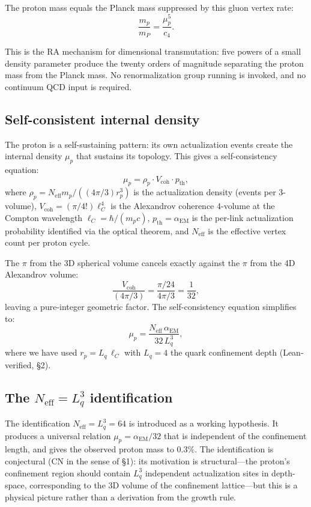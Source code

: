 \documentclass[11pt]{article}
\begin{document}
The proton mass equals the Planck mass suppressed by this gluon vertex rate:
\begin{equation}
\frac{m_p}{m_P} = \frac{\mu_p^5}{c_4}.
\end{equation}

This is the RA mechanism for dimensional transmutation: five powers of a small density parameter produce the twenty orders of magnitude separating the proton mass from the Planck mass. No renormalization group running is invoked, and no continuum QCD input is required.

\subsection{Self-consistent internal density}

The proton is a self-sustaining pattern: its own actualization events create the internal density $\mu_p$ that sustains its topology. This gives a self-consistency equation:
\begin{equation}
\mu_p = \rho_p\cdot V_{\mathrm{coh}}\cdot p_{\mathrm{th}},
\end{equation}
where $\rho_p=N_{\mathrm{eff}}m_p/((4\pi/3)r_p^3)$ is the actualization density (events per 3-volume), $V_{\mathrm{coh}}=(\pi/4!)\ell_C^4$ is the Alexandrov coherence 4-volume at the Compton wavelength $\ell_C=\hbar/(m_p c)$, $p_{\mathrm{th}}=\alpha_{\mathrm{EM}}$ is the per-link actualization probability identified via the optical theorem, and $N_{\mathrm{eff}}$ is the effective vertex count per proton cycle.

The $\pi$ from the 3D spherical volume cancels exactly against the $\pi$ from the 4D Alexandrov volume:
\begin{equation}
\frac{V_{\mathrm{coh}}}{(4\pi/3)} = \frac{\pi/24}{4\pi/3} = \frac{1}{32},
\end{equation}
leaving a pure-integer geometric factor. The self-consistency equation simplifies to:
\begin{equation}
\mu_p = \frac{N_{\mathrm{eff}}\,\alpha_{\mathrm{EM}}}{32\,L_q^3},
\end{equation}
where we have used $r_p=L_q\,\ell_C$ with $L_q=4$ the quark confinement depth (Lean-verified, \S2).

\subsection{The $N_{\mathrm{eff}}=L_q^3$ identification}

The identification $N_{\mathrm{eff}}=L_q^3=64$ is introduced as a working hypothesis. It produces a universal relation $\mu_p=\alpha_{\mathrm{EM}}/32$ that is independent of the confinement length, and gives the observed proton mass to $0.3\%$. The identification is conjectural (CN in the sense of \S1): its motivation is structural---the proton's confinement region should contain $L_q^3$ independent actualization sites in depth-space, corresponding to the 3D volume of the confinement lattice---but this is a physical picture rather than a derivation from the growth rule.
\end{document}
